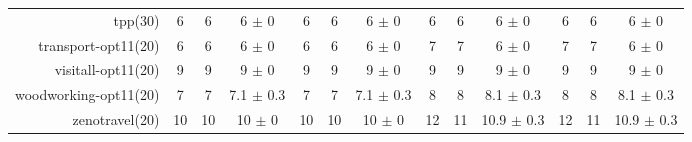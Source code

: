 \begin{center}
\begin{tabular}{|r|*{4}{ccc|}}
tpp(30) & 6 & 6 & 6 \(\pm\) 0 & 6 & 6 & 6 \(\pm\) 0 & 6 & 6 & 6 \(\pm\) 0 & 6 & 6 & 6 \(\pm\) 0\\
transport-opt11(20) & 6 & 6 & 6 \(\pm\) 0 & 6 & 6 & 6 \(\pm\) 0 & 7 & 7 & 6 \(\pm\) 0 & 7 & 7 & 6 \(\pm\) 0\\
visitall-opt11(20) & 9 & 9 & 9 \(\pm\) 0 & 9 & 9 & 9 \(\pm\) 0 & 9 & 9 & 9 \(\pm\) 0 & 9 & 9 & 9 \(\pm\) 0\\
woodworking-opt11(20) & 7 & 7 & 7.1 \(\pm\) 0.3 & 7 & 7 & 7.1 \(\pm\) 0.3 & 8 & 8 & 8.1 \(\pm\) 0.3 & 8 & 8 & 8.1 \(\pm\) 0.3\\
zenotravel(20) & 10 & 10 & 10 \(\pm\) 0 & 10 & 10 & 10 \(\pm\) 0 & 12 & 11 & 10.9 \(\pm\) 0.3 & 12 & 11 & 10.9 \(\pm\) 0.3\\
\end{tabular}
\end{center}
